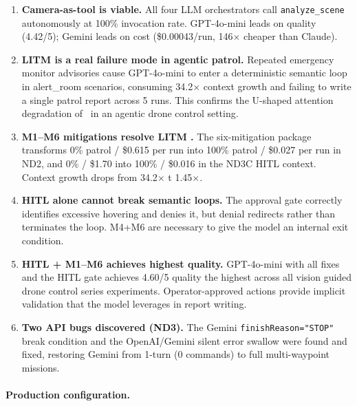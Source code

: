 \begin{enumerate}
  \item \textbf{Camera-as-tool is viable.}  All four LLM orchestrators call \texttt{analyze\_scene} autonomously at 100\% invocation rate.  
  GPT-4o-mini leads on quality (4.42/5); Gemini leads on cost (\$0.00043/run, 146$\times$ cheaper than Claude).

  \item \textbf{LITM is a real failure mode in agentic patrol.}  
  Repeated emergency monitor advisories cause GPT-4o-mini to enter a deterministic semantic loop in alert\_room scenarios, consuming 34.2$\times$ context growth and failing to write a single patrol report across 5 runs.  
  This confirms the U-shaped attention degradation of~\citet{liu2023lostinthemiddle} in an agentic drone control setting.

  \item \textbf{M1--M6 mitigations resolve LITM .}  The six-mitigation package transforms 0\% patrol / \$0.615 per run into 100\% patrol / \$0.027 per run in ND2, and 0\% / \$1.70 into 100\% / \$0.016 in the ND3C HITL context.  
  Context growth drops from 34.2$\times$ t 1.45$\times$.

  \item \textbf{HITL alone cannot break semantic loops.}  The approval gate correctly identifies excessive hovering and denies it, but denial redirects rather than terminates the loop.  
  M4+M6 are necessary to give the model an internal exit condition.

  \item \textbf{HITL + M1--M6 achieves highest quality.}  GPT-4o-mini with all fixes and the HITL gate achieves 4.60/5 quality the highest across all vision guided drone control series experiments.  Operator-approved actions provide implicit validation that the model leverages in report writing.

  \item \textbf{Two API bugs discovered (ND3).}  The Gemini \texttt{finishReason="STOP"} break condition and the OpenAI/Gemini silent error swallow were found and fixed, restoring Gemini from 1-turn (0 commands) to full multi-waypoint missions.
\end{enumerate}

\paragraph{Production configuration.}

